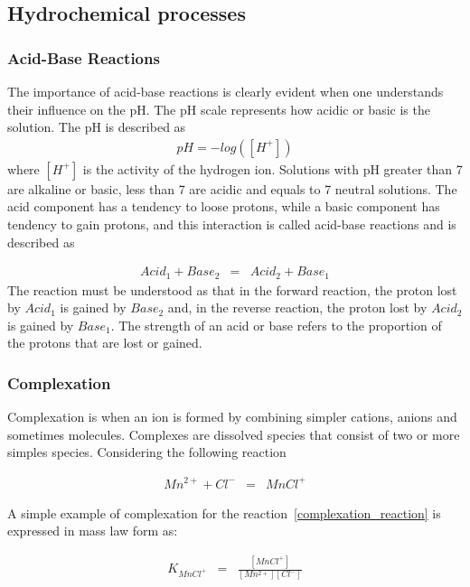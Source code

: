 \subsection{Hydrochemical processes}

\subsubsection{Acid-Base Reactions}
The importance of acid-base reactions is clearly evident when one understands their influence on the pH. The pH scale represents how acidic or basic is the solution. The pH is described as
\begin{eqnarray}
pH = - log([H^+])
\end{eqnarray}
where $[H^+]$ is the activity of the hydrogen ion. Solutions with pH greater than 7 are alkaline or basic, less than 7 are acidic and equals to 7 neutral solutions.
The acid component has a tendency to loose protons, while a basic component has tendency to gain protons, and this interaction is called acid-base reactions and is described as

\begin{eqnarray}
Acid_1 + Base_2 &=& Acid_2 + Base_1
\end{eqnarray}
The reaction must be understood as that in the forward reaction, the proton lost by $Acid_1$ is gained by $Base_2$ and, in the reverse reaction, the proton lost by $Acid_2$ is gained by $Base_1$.  The strength of an acid or base refers to the proportion of the protons that are lost or gained. 

\subsubsection{Complexation}
Complexation is when an ion is formed by combining simpler cations, anions and sometimes molecules. Complexes are dissolved species that consist of two or more simples species. Considering the following reaction

\begin{eqnarray}\label{complexation_reaction}
Mn^{2+} + Cl^- &=& MnCl^+
\end{eqnarray}

A simple example of complexation for the reaction~\ref{complexation_reaction} is expressed in mass law form as:

\begin{eqnarray}
K_{MnCl^+} &=& \frac{[MnCl^+]}{[Mn^{2+}][Cl^-]}
\end{eqnarray}

